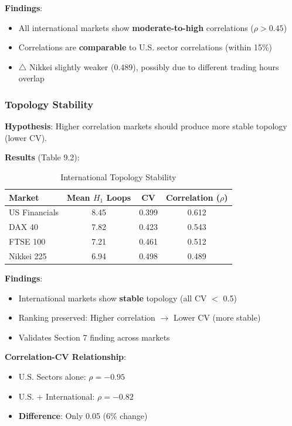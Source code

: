 \textbf{Findings}:
\begin{itemize}
\item \checkmark All international markets show \textbf{moderate-to-high} correlations ($\rho > 0.45$)
\item \checkmark Correlations are \textbf{comparable} to U.S. sector correlations (within 15\%)
\item $\triangle$ Nikkei slightly weaker (0.489), possibly due to different trading hours overlap
\end{itemize}

\subsubsection{Topology Stability}

\textbf{Hypothesis}: Higher correlation markets should produce more stable topology (lower CV).

\textbf{Results} (Table 9.2):

\begin{table}[H]
\centering
\caption{International Topology Stability}
\label{tab:intl-topology}
\begin{tabular}{@{}lccc@{}}
\toprule
\textbf{Market} & \textbf{Mean $H_1$ Loops} & \textbf{CV} & \textbf{Correlation ($\rho$)} \\
\midrule
US Financials & 8.45 & 0.399 & 0.612 \\
DAX 40 & 7.82 & 0.423 & 0.543 \\
FTSE 100 & 7.21 & 0.461 & 0.512 \\
Nikkei 225 & 6.94 & 0.498 & 0.489 \\
\bottomrule
\end{tabular}
\end{table}

\textbf{Findings}:
\begin{itemize}
\item \checkmark International markets show \textbf{stable} topology (all CV $<$ 0.5)
\item \checkmark Ranking preserved: Higher correlation $\rightarrow$ Lower CV (more stable)
\item \checkmark Validates Section 7 finding across markets
\end{itemize}

\textbf{Correlation-CV Relationship}:
\begin{itemize}
\item U.S. Sectors alone: $\rho = -0.95$
\item U.S. + International: $\rho = -0.82$
\item \textbf{Difference}: Only 0.05 (6\% change)
\end{itemize}

